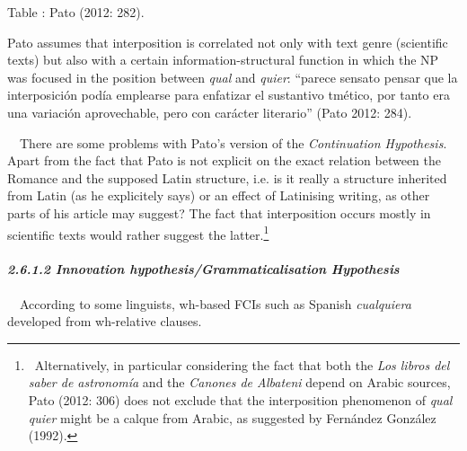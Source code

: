 \begin{styletablecaption}
Table : Pato (2012: 282).
\end{styletablecaption}

\begin{styleStandard}
Pato assumes that interposition is correlated not only with text genre (scientific texts) but also with a certain information-structural function in which the NP was focused in the position between \textit{qual} and \textit{quier}: “parece sensato pensar que la interposición podía emplearse para enfatizar el sustantivo tmético, por tanto era una variación aprovechable, pero con carácter literario” (Pato 2012: 284).
\end{styleStandard}

\begin{styleStandard}
\ \ There are some problems with Pato’s version of the \textit{Continuation Hypothesis}. Apart from the fact that Pato is not explicit on the exact relation between the Romance and the supposed Latin structure, i.e. is it really a structure inherited from Latin (as he explicitely says) or an effect of Latinising writing, as other parts of his article may suggest? The fact that interposition occurs mostly in scientific texts would rather suggest the latter.\footnote{\ Alternatively, in particular considering the fact that both the \textrm{\textit{Los libros del saber de astronomía}}\textrm{ and the }\textrm{\textit{Canones de Albateni}}\textrm{ depend on Arabic sources, Pato (2012: 306) does not exclude that the interposition phenomenon of }\textrm{\textit{qual quier}}\textrm{ might be a calque from Arabic, as suggested by Fernández González (1992).}} 
\end{styleStandard}

\paragraph[2.6.1.2 Innovation hypothesis/Grammaticalisation Hypothesis]{\textit{2.6.1.2 Innovation hypothesis/Grammaticalisation Hypothesis}}
\begin{styleStandard}
\ \ According to some linguists, wh-based FCIs such as Spanish \textit{cualquiera} developed from wh-relative clauses. 
\end{styleStandard}

